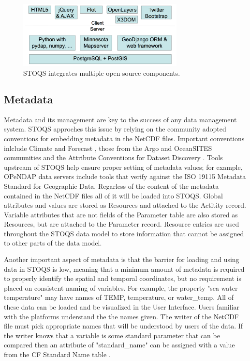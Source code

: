 \documentclass[conference]{IEEEtran}
\begin{document}
\begin{figure}[htbp]
\centering
\includegraphics[width=3.3in]{stoqs_arch_simple.png}
\caption{STOQS integrates multiple open-source components.}
\label{fig:STOQSArch}
\end{figure}

\subsection{Metadata}

Metadata and its management are key to the success of any data management system. STOQS approches this issue by relying on the community adopted conventions for embedding metadata in the NetCDF files. Important conventions inlclude Climate and Forecast \cite{CF}, those from the Argo and OceanSITES communities \cite{Pouliquen2006} and the Attribute Conventions for Dataset Discovery \cite{ACDD}. Tools upstream of STOQS help ensure proper setting of metadata values; for example, OPeNDAP data servers include tools that verify against the ISO 19115 Metadata Standard for Geographic Data. Regarless of the content of the metadata contained in the NetCDF files all of it will be loaded into STOQS. Global attributes and values are stored as Resources and attached to the Actitity record. Variable attributes that are not fields of the Parameter table are also stored as Resources, but are attached to the Parameter record. Resource entries are used throughout the STOQS data model to store information that cannot be assigned to other parts of the data model.

Another important aspect of metadata is that the barrier for loading and using data in STOQS is low, meaning that a minimum amount of metadata is required to properly identify the spatial and temporal coordinates, but no requirement is placed on consistent naming of variables. For example, the property "sea water temperature" may have names of TEMP, temperature, or water\_temp. All of these data can be loaded and be visualized in the User Interface. Users familiar with the platforms understand the the names given. The writer of the NetCDF file must pick appropriate names that will be understood by users of the data. If the writer knows that a variable is some standard parameter that can be compared then an attribute of "standard\_name" can be assigned with a value from the CF Standard Name table \cite{CFSN}. 
\end{document}
